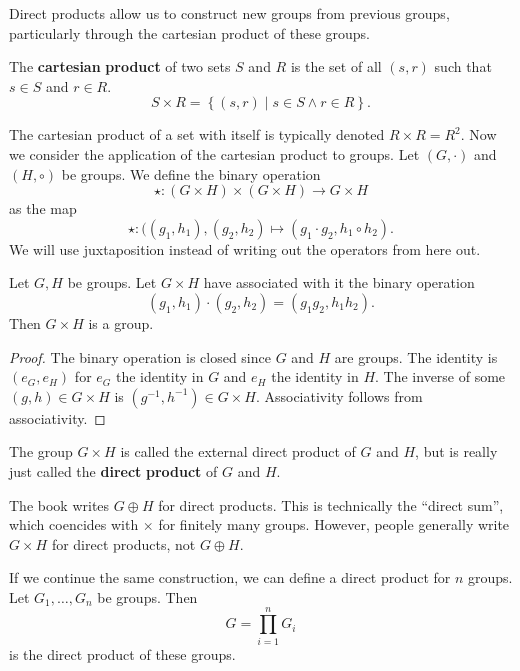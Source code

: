 
Direct products allow us to construct new groups from previous groups, particularly through the cartesian product of these groups.

\begin{definition}\label{dfn:unknown}
	The \textbf{cartesian} \textbf{product} of two sets $S$ and $R$ is the set of all $(s,r)$ such that $s\in S$ and $r\in R$.
	\[
		S\times R=\left\{ (s,r) \mid s\in S\land r\in R \right\} 
	.\]
\end{definition}

The cartesian product of a set with itself is typically denoted $R\times R=R^2$. Now we consider the application of the cartesian product to groups. Let $(G,\cdot )$ and $(H,\circ )$ be groups. We define the binary operation
\[
	\star : (G\times H) \times (G \times H) \to G\times H
\]
as the map
\[
	\star : ((g_1,h_1),(g_2,h_2) \mapsto (g_1 \cdot g_2,h_1\circ h_2)
.\]
We will use juxtaposition instead of writing out the operators from here out.
\begin{proposition}
	Let $G,H$ be groups. Let $G\times H$ have associated with it the binary operation
	\[
		(g_1,h_1)\cdot (g_2,h_2) = (g_1g_2,h_1h_2)
	.\]
	Then $G\times H$ is a group.
\end{proposition}
\begin{proof}
	The binary operation is closed since $G$ and $H$ are groups. The identity is $(e_G,e_H)$ for $e_G$ the identity in $G$ and $e_H$ the identity in $H$. The inverse of some $(g,h)\in G\times H$ is $\left( g^{-1},h^{-1} \right) \in G\times H$. Associativity follows from associativity.
\end{proof}

\begin{definition}\label{dfn:es}
	The group $G\times H$ is called the external direct product of $G$ and $H$, but is really just called the \textbf{direct} \textbf{product} of $G$ and $H$.
\end{definition}
\begin{notation}
	The book writes $G\oplus H$ for direct products. This is technically the ``direct sum'', which coencides with $\times $ for finitely many groups. However, people generally write $G\times H$ for direct products, not $G\oplus H$.
\end{notation}

If we continue the same construction, we can define a direct product for $n$ groups. Let $G_1, \dots, G_n $ be groups. Then 
\[
	G = \prod_{i=1}^{n} G_i 
\]
is the direct product of these groups.

